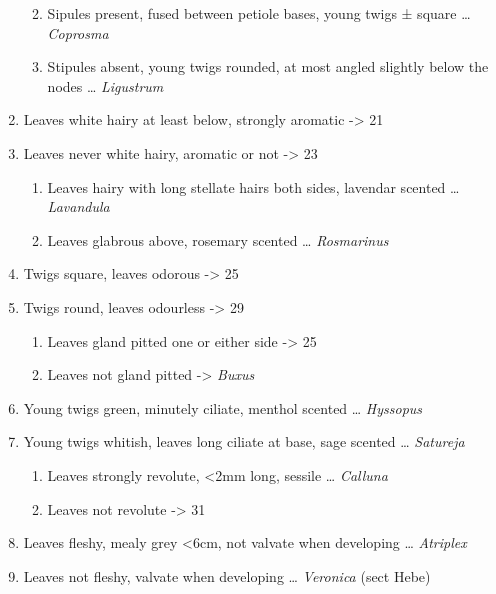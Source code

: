 \documentclass[openany]{book}
\providecommand{\tightlist}{%
  \setlength{\itemsep}{0pt}\setlength{\parskip}{0pt}}
\begin{document}
\begin{enumerate}
  \begin{enumerate}
  \def\labelenumii{\arabic{enumii}.}
  \setcounter{enumii}{16}
  \tightlist
  \item
    Sipules present, fused between petiole bases, young twigs ± square
    \ldots{} \emph{Coprosma}
  \item
    Stipules absent, young twigs rounded, at most angled slightly below
    the nodes \ldots{} \emph{Ligustrum}
  \end{enumerate}
\item
  Leaves white hairy at least below, strongly aromatic -\textgreater{}
  21
\item
  Leaves never white hairy, aromatic or not -\textgreater{} 23

  \begin{enumerate}
  \def\labelenumii{\arabic{enumii}.}
  \setcounter{enumii}{20}
  \tightlist
  \item
    Leaves hairy with long stellate hairs both sides, lavendar scented
    \ldots{} \emph{Lavandula}
  \item
    Leaves glabrous above, rosemary scented \ldots{} \emph{Rosmarinus}
  \end{enumerate}
\item
  Twigs square, leaves odorous -\textgreater{} 25
\item
  Twigs round, leaves odourless -\textgreater{} 29

  \begin{enumerate}
  \def\labelenumii{\arabic{enumii}.}
  \setcounter{enumii}{24}
  \tightlist
  \item
    Leaves gland pitted one or either side -\textgreater{} 25
  \item
    Leaves not gland pitted -\textgreater{} \emph{Buxus}
  \end{enumerate}
\item
  Young twigs green, minutely ciliate, menthol scented \ldots{}
  \emph{Hyssopus}
\item
  Young twigs whitish, leaves long ciliate at base, sage scented
  \ldots{} \emph{Satureja}

  \begin{enumerate}
  \def\labelenumii{\arabic{enumii}.}
  \setcounter{enumii}{28}
  \tightlist
  \item
    Leaves strongly revolute, \textless{}2mm long, sessile \ldots{}
    \emph{Calluna}
  \item
    Leaves not revolute -\textgreater{} 31
  \end{enumerate}
\item
  Leaves fleshy, mealy grey \textless{}6cm, not valvate when developing
  \ldots{} \emph{Atriplex}
\item
  Leaves not fleshy, valvate when developing \ldots{} \emph{Veronica}
  (sect Hebe)
\end{enumerate}
\end{document}
